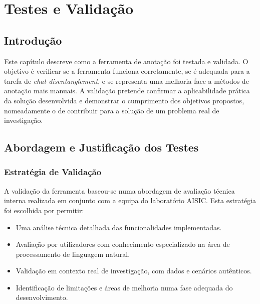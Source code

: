\chapter{Testes e Validação}

\section{Introdução}

Este capítulo descreve como a ferramenta de anotação foi testada e validada. O objetivo é verificar se a ferramenta funciona corretamente, se é adequada para a tarefa de \textit{chat disentanglement}, e se representa uma melhoria face a métodos de anotação mais manuais. A validação pretende confirmar a aplicabilidade prática da solução desenvolvida e demonstrar o cumprimento dos objetivos propostos, nomeadamente o de contribuir para a solução de um problema real de investigação.

\section{Abordagem e Justificação dos Testes}

\subsection{Estratégia de Validação}
A validação da ferramenta baseou-se numa abordagem de avaliação técnica interna realizada em conjunto com a equipa do laboratório AISIC. Esta estratégia foi escolhida por permitir:
\begin{itemize}
    \item Uma análise técnica detalhada das funcionalidades implementadas.
    \item Avaliação por utilizadores com conhecimento especializado na área de processamento de linguagem natural.
    \item Validação em contexto real de investigação, com dados e cenários autênticos.
    \item Identificação de limitações e áreas de melhoria numa fase adequada do desenvolvimento.
\end{itemize}

